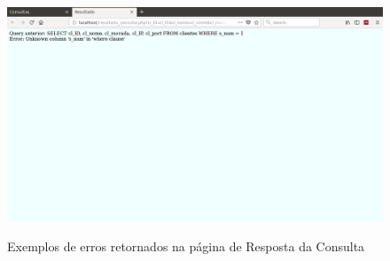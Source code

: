 \documentclass[11pt,twoside,a4paper]{report}
\begin{document}
\begin{figure}[H]
	\begin{minipage}{1\textwidth}
		\begin{center}
			\includegraphics[trim={0 20cm 0 0},clip,width=1\textwidth]{consultas05} %
			\label{fig:consultas6}
		\end{center}
	\end{minipage}
	\caption{Exemplos de erros retornados na página de Resposta da Consulta}
	\label{fig:consultas3}
\end{figure}

\newpage
\end{document}
